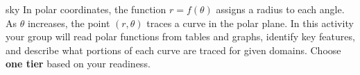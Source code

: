 \documentclass[10pt]{article}
\begin{document}
\namepartnerperiod

\vspace{0.08in}

\begin{scenariobox}{sky}
In polar coordinates, the function $r = f(\theta)$ assigns a radius to each angle.
As $\theta$ increases, the point $(r, \theta)$ traces a curve in the polar plane.
In this activity your group will read polar functions from tables and graphs,
identify key features, and describe what portions of each curve are traced for
given domains. Choose \textbf{one tier} based on your readiness.
\end{scenariobox}

\vspace{0.08in}
\end{document}
